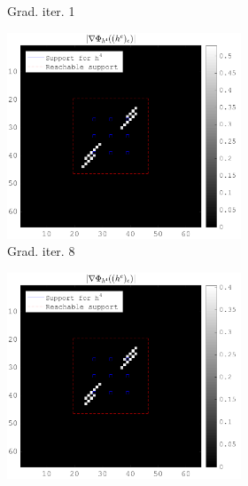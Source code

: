 \begin{figure}[!ht]
\begin{subfigure}[b]{0.49\textwidth}
\begin{subfigure}[b]{0.49\textwidth}
	\caption{Grad. iter. 1}
	\end{subfigure}
	\begin{subfigure}[b]{0.49\textwidth}\centering
	\includegraphics[width=\textwidth]{figures/xp_grad_iterations/xp_128x128_sc2_angl1_K3_S3_node4_8thiteration_partgrad4_bestvalues.png}
	\caption{Grad. iter. 8}
	\end{subfigure}
	\begin{subfigure}[b]{0.49\textwidth}\centering
	\includegraphics[width=\textwidth]{figures/xp_grad_iterations/xp_128x128_sc2_angl1_K3_S3_node4_20thiteration_partgrad4_bestvalues.png}

\end{subfigure}
\end{subfigure}
\end{figure}
